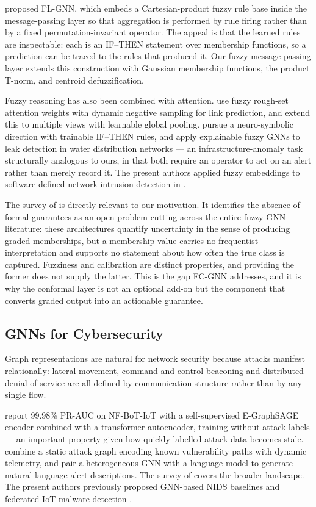\citet{flgnn} proposed FL-GNN, which embeds a Cartesian-product fuzzy rule base
inside the message-passing layer so that aggregation is performed by rule firing
rather than by a fixed permutation-invariant operator. The appeal is that the
learned rules are inspectable: each is an IF--THEN statement over membership
functions, so a prediction can be traced to the rules that produced it. Our
fuzzy message-passing layer extends this construction with Gaussian membership
functions, the product T-norm, and centroid defuzzification.

Fuzzy reasoning has also been combined with attention. \citet{fgat} use fuzzy
rough-set attention weights with dynamic negative sampling for link prediction,
and \citet{mfgat} extend this to multiple views with learnable global pooling.
\citet{firegnn} pursue a neuro-symbolic direction with trainable IF--THEN rules,
and \citet{fgenconv} apply explainable fuzzy GNNs to leak detection in water
distribution networks — an infrastructure-anomaly task structurally analogous to
ours, in that both require an operator to act on an alert rather than merely
record it. The present authors applied fuzzy embeddings to software-defined
network intrusion detection in \citep{dang24fuzzy}.

The survey of \citet{fgnn_survey} is directly relevant to our motivation. It
identifies the absence of formal guarantees as an open problem cutting across
the entire fuzzy GNN literature: these architectures quantify uncertainty in the
sense of producing graded memberships, but a membership value carries no
frequentist interpretation and supports no statement about how often the true
class is captured. Fuzziness and calibration are distinct properties, and
providing the former does not supply the latter. This is the gap FC-GNN
addresses, and it is why the conformal layer is not an optional add-on but the
component that converts graded output into an actionable guarantee.

\subsection{GNNs for Cybersecurity}

Graph representations are natural for network security because attacks manifest
relationally: lateral movement, command-and-control beaconing and distributed
denial of service are all defined by communication structure rather than by any
single flow.

\citet{graphids} report 99.98\% PR-AUC on NF-BoT-IoT with a self-supervised
E-GraphSAGE encoder combined with a transformer autoencoder, training without
attack labels — an important property given how quickly labelled attack data
becomes stale. \citet{gnnids} combine a static attack graph encoding known
vulnerability paths with dynamic telemetry, and \citet{xgnid} pair a
heterogeneous GNN with a language model to generate natural-language alert
descriptions. The survey of \citet{gnn_ids_survey} covers the broader landscape.
The present authors previously proposed GNN-based NIDS baselines
\citep{dang23wifi} and federated IoT malware detection \citep{dang24federated}.

